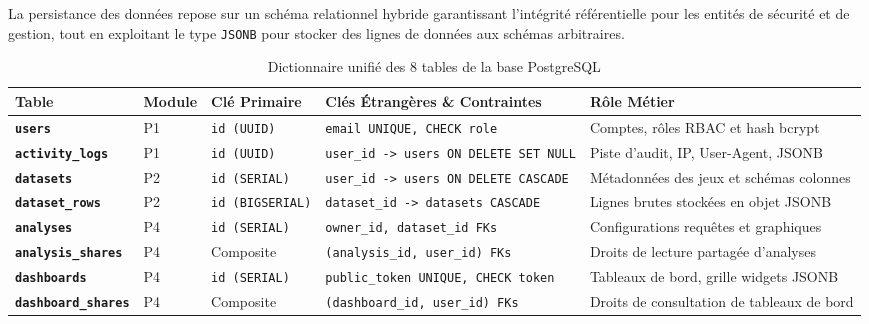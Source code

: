 \documentclass[11pt,a4paper]{article}
\begin{document}
La persistance des données repose sur un schéma relationnel hybride garantissant l'intégrité référentielle pour les entités de sécurité et de gestion, tout en exploitant le type \texttt{JSONB} pour stocker des lignes de données aux schémas arbitraires.

\begin{table}[h!]
\centering
\small
\renewcommand{\arraystretch}{1.2}
\begin{tabularx}{\textwidth}{>{\bfseries}p{2.6cm} p{1.2cm} p{2.2cm} p{3.8cm} X}
    \toprule
    \rowcolor{tableheader}
    \color{white}Table & \color{white}Module & \color{white}Clé Primaire & \color{white}Clés Étrangères \& Contraintes & \color{white}Rôle Métier \\
    \midrule
    \texttt{users} & P1 & \texttt{id (UUID)} & \texttt{email UNIQUE, CHECK role} & Comptes, rôles RBAC et hash bcrypt \\
    \rowcolor{tablerowalt}
    \texttt{activity\_logs} & P1 & \texttt{id (UUID)} & \texttt{user\_id -> users ON DELETE SET NULL} & Piste d'audit, IP, User-Agent, JSONB \\
    \texttt{datasets} & P2 & \texttt{id (SERIAL)} & \texttt{user\_id -> users ON DELETE CASCADE} & Métadonnées des jeux et schémas colonnes \\
    \rowcolor{tablerowalt}
    \texttt{dataset\_rows} & P2 & \texttt{id (BIGSERIAL)} & \texttt{dataset\_id -> datasets CASCADE} & Lignes brutes stockées en objet JSONB \\
    \texttt{analyses} & P4 & \texttt{id (SERIAL)} & \texttt{owner\_id, dataset\_id FKs} & Configurations requêtes et graphiques \\
    \rowcolor{tablerowalt}
    \texttt{analysis\_shares} & P4 & Composite & \texttt{(analysis\_id, user\_id) FKs} & Droits de lecture partagée d'analyses \\
    \texttt{dashboards} & P4 & \texttt{id (SERIAL)} & \texttt{public\_token UNIQUE, CHECK token} & Tableaux de bord, grille widgets JSONB \\
    \rowcolor{tablerowalt}
    \texttt{dashboard\_shares} & P4 & Composite & \texttt{(dashboard\_id, user\_id) FKs} & Droits de consultation de tableaux de bord \\
    \bottomrule
\end{tabularx}
\caption{Dictionnaire unifié des 8 tables de la base PostgreSQL}
\end{table}
\end{document}
